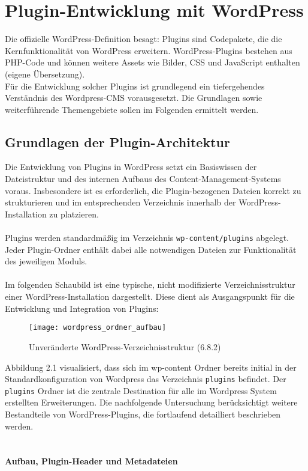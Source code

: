 \section{Plugin-Entwicklung mit WordPress}

Die offizielle WordPress-Definition besagt: \glqq Plugins sind Codepakete, die die Kernfunktionalität von WordPress erweitern.
WordPress-Plugins bestehen aus PHP-Code und können weitere Assets wie Bilder,
CSS und JavaScript enthalten\grqq{} \cite{wordpress2024plugin} (eigene Übersetzung).
\\
Für die Entwicklung solcher Plugins ist grundlegend ein tiefergehendes Verständnis des Wordpress-CMS vorausgesetzt.
Die Grundlagen sowie weiterführende Themengebiete sollen im Folgenden ermittelt werden.



\subsection{Grundlagen der Plugin-Architektur}

Die Entwicklung von Plugins in WordPress setzt ein Basiswissen der Dateistruktur und des internen Aufbaus des Content-Management-Systems voraus.
Insbesondere ist es erforderlich, die Plugin-bezogenen Dateien korrekt zu strukturieren und im entsprechenden Verzeichnis innerhalb der WordPress-Installation zu platzieren.\\\\
Plugins werden standardmäßig im Verzeichnis \texttt{wp-content/plugins} abgelegt.
Jeder Plugin-Ordner enthält dabei alle notwendigen Dateien zur Funktionalität des jeweiligen Moduls.\\\\
Im folgenden Schaubild ist eine typische, nicht modifizierte Verzeichnisstruktur einer WordPress-Installation dargestellt.
Diese dient als Ausgangspunkt für die Entwicklung und Integration von Plugins:

\begin{figure}[tbh]
 \centering
 \texttt{[image: wordpress\_ordner\_aufbau]}
 \caption{Unveränderte WordPress-Verzeichnisstruktur (6.8.2)}
 \label{fig:wordpress-verzeichnis}
\end{figure}
\newpage
Abbildung 2.1 visualisiert, dass sich im wp-content Ordner bereits initial in der Standardkonfiguration von Wordpress das Verzeichnis \texttt{plugins} befindet.
Der \texttt{plugins} Ordner ist die zentrale Destination für alle im Wordpress System erstellten Erweiterungen.
Die nachfolgende Untersuchung berücksichtigt weitere Bestandteile von WordPress-Plugins, die fortlaufend detailliert beschrieben werden.
\\\\\\
\textbf{Aufbau, Plugin-Header und Metadateien}

